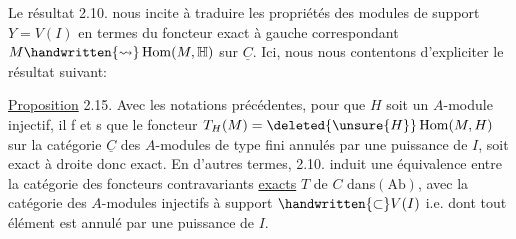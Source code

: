Le résultat 2.10. nous incite à traduire les propriétés des
modules  de support $Y=V(I)$ en termes du foncteur exact à gauche
correspondant $M\handwritten{\leadsto}\operatorname{Hom}(M,\mathbb H)$ sur $\underline C$. Ici, nous nous contentons d'expliciter
le résultat suivant:

\uline{Proposition} 2.15. Avec les notations précédentes, pour que $H$ soit un
$A$-module injectif, il f et s que le foncteur $T_H(M)=\deleted{\unsure{H}}\operatorname{Hom}(M,H)$ sur la
catégorie $\underline C$ des $A$-modules de type fini  annulés par une puissance
de $I$, soit exact à droite donc exact. En d'autres termes, 2.10. induit
une équivalence entre la catégorie des foncteurs contravariants \uline{exacts}
$T$ de $C$ dans$(\mathrm{Ab})$, avec la catégorie des $A$-modules injectifs à support $\handwritten{\subset}V(I)$
i.e. dont tout élément est annulé par une puissance de $I$.

